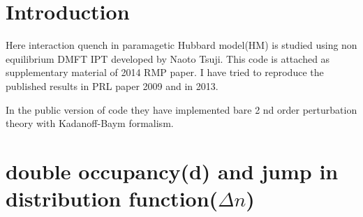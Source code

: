 \section{Introduction}
Here interaction quench in paramagetic Hubbard model(HM) is studied using non equilibrium DMFT IPT developed by Naoto Tsuji. This code is attached as supplementary material of 2014 RMP paper\cite{RMP}. I have tried to reproduce the published results in PRL \cite{HUB_para} paper 2009 and \cite{HUB} in 2013.

In the public version of code they have implemented bare 2 nd order perturbation theory with Kadanoff-Baym formalism.




\section{double occupancy(d) and jump in distribution function($\Delta n$)  }

